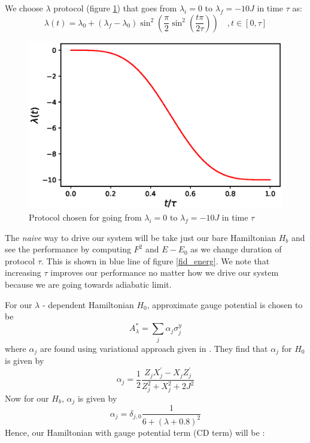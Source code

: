 \documentclass[11pt,a4paper]{article}
\begin{document}
 We choose $\lambda$  protocol (figure \ref{protocol_figure}) that goes from $\lambda_i=0$ to $\lambda_f=-10 J$ in time $\tau$ as:
\begin{equation}
\lambda(t) = \lambda_0 + (\lambda_f-\lambda_0)\sin^2\left(\dfrac{\pi}{2}\sin^2\left(\dfrac{t\pi}{2 \tau}\right)  \right) \quad, t \in [0, \tau]
\end{equation}

\begin{figure}
\centering
\includegraphics[scale=0.67]{protocol.eps}
\caption{Protocol chosen for going from $\lambda_i=0$ to $\lambda_f=-10J$ in time $\tau$}
\label{protocol_figure}
\end{figure}

The \textit{naive} way to drive our system will be take just our bare Hamiltonian $H_b$ and see the performance by computing $F^2$ and $E-E_0$ as we change duration of protocol $\tau$. This is shown in blue line of figure \ref{fid_energ}. We note that increasing $\tau$ improves our performance no matter how we drive our system because we are going towards adiabatic limit.


For our $\lambda$ - dependent  Hamiltonian $H_0$, approximate gauge potential is chosen to be 
\begin{equation}
A_{\lambda}^*= \sum_j \alpha_j \sigma_j^y
\end{equation}
where $\alpha_j$ are found using variational approach given in \cite{sels2017minimizing}. They find that $\alpha_j$ for $H_0$ is given by 
\begin{equation}
\alpha_j= \dfrac{1}{2} \dfrac{Z_j X_j^{\prime}- X_j Z_j^{\prime}}{Z_j^2 + X_j^2 +2J^2}
\end{equation}
Now for our $H_b$, $\alpha_j$ is given by 
\begin{equation}
\alpha_j= \delta_{j,0} \dfrac{1}{6 + (\lambda +0.8)^2}
\end{equation}
Hence, our  Hamiltonian with gauge potential term (CD term)  will be :
\end{document}
